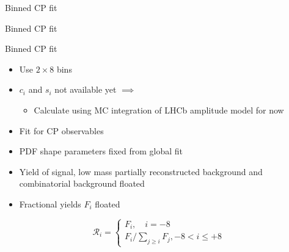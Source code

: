 \documentclass{beamer}
\begin{document}
\begin{frame}{Binned CP fit}
  \begin{center}
    {\huge Binned CP fit}
  \end{center}
\end{frame}

\begin{frame}{Binned CP fit}
  \begin{itemize}
    \setlength\itemsep{1.2em}
    \item{Use $2\times 8$ bins}
    \item{$c_i$ and $s_i$ not available yet $\implies$}
    \begin{itemize}
      \item{Calculate using MC integration of LHCb amplitude model for now}
    \end{itemize}
    \item{Fit for CP observables}
    \item{PDF shape parameters fixed from global fit}
    \item{Yield of signal, low mass partially reconstructed background and combinatorial background floated}
    \item{Fractional yields $F_i$ floated}
  \end{itemize}
  \begin{equation*}
    \mathcal{R}_i = 
    \begin{cases}
      F_i, \quad i = -8 \\
      F_i/\sum_{j\geq i}F_j, -8 < i\leq+8
    \end{cases}
  \end{equation*}
\end{frame}
\end{document}
